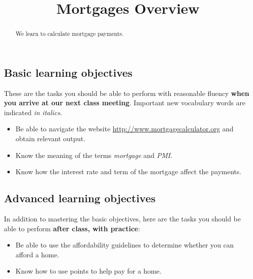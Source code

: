 \documentclass{ximera}
\title{Mortgages Overview}
\begin{document}
\begin{abstract}
We learn to calculate mortgage payments.
\end{abstract}
\maketitle

\subsection*{Basic learning objectives}

These are the tasks you should be able to perform with reasonable fluency \textbf{when you arrive at our next class meeting}. Important new vocabulary words are indicated \emph{in italics}. 

\begin{itemize}
	\item Be able to navigate the website \href{http://www.mortgagecalculator.org}{http://www.mortgagecalculator.org} and obtain relevant output.
    \item Know the meaning of the terms \emph{mortgage} and \emph{PMI}. 
    \item Know how the interest rate and term of the mortgage affect the payments.
\end{itemize}

\subsection*{Advanced learning objectives}

In addition to mastering the basic objectives, here are the tasks you should be able to perform \textbf{after class, with practice}: 

\begin{itemize}
	\item Be able to use the affordability guidelines to determine whether you can afford a home.
    \item Know how to use points to help pay for a home.
\end{itemize}
\end{document}
